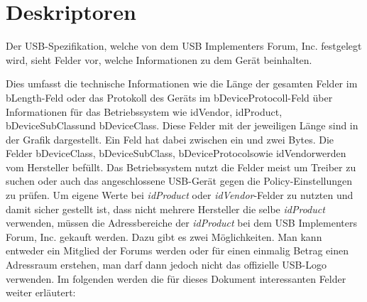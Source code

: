 \newpage
\section{Deskriptoren}\label{Deskriptoren}
Der USB-Spezifikation, welche von dem USB Implementers Forum, Inc.\cite{USBAbout} festgelegt wird, sieht Felder vor, welche Informationen zu dem Gerät beinhalten.


Dies umfasst die technische Informationen wie die Länge der gesamten Felder im \glqq bLength\grqq-Feld oder das Protokoll des Geräts im \glqq bDeviceProtocoll\grqq-Feld über Informationen für das Betriebssystem wie \glqq idVendor\grqq, \glqq idProduct\grqq, \glqq bDeviceSubClass\grqq und \glqq bDeviceClass\grqq. Diese Felder mit der jeweiligen Länge sind in der Grafik dargestellt. Ein Feld hat dabei zwischen ein und zwei Bytes. Die Felder \glqq bDeviceClass\grqq, \glqq bDeviceSubClass\grqq, \glqq bDeviceProtocol\grqq sowie \glqq idVendor\grqq werden vom Hersteller befüllt.\cite{USBDesk} Das Betriebssystem nutzt die Felder meist um Treiber zu suchen oder auch das angeschlossene USB-Gerät gegen die Policy-Einstellungen zu prüfen. Um eigene Werte bei \textit{idProduct} oder \textit{idVendor}-Felder zu nutzten und damit sicher gestellt ist, dass nicht mehrere Hersteller die selbe \textit{idProduct} verwenden, müssen die Adressbereiche der \textit{idProduct} bei dem USB Implementers Forum, Inc. gekauft werden. Dazu gibt es zwei Möglichkeiten. Man kann entweder ein Mitglied der Forums werden oder für einen einmalig Betrag einen Adressraum erstehen, man darf dann jedoch nicht das offizielle USB-Logo verwenden. \cite{USBVendor} Im folgenden werden die für dieses Dokument interessanten Felder weiter erläutert:

